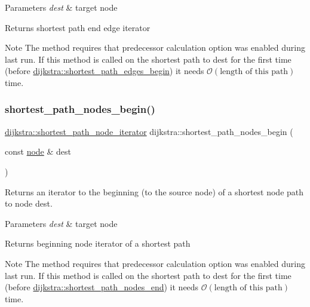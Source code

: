\begin{DoxyParams}{Parameters}
{\em dest} & target node\\
\hline
\end{DoxyParams}
\begin{DoxyReturn}{Returns}
shortest path end edge iterator
\end{DoxyReturn}
\begin{DoxyNote}{Note}
The method requires that predecessor calculation option was enabled during last run. If this method is called on the shortest path to {\ttfamily dest} for the first time (before \mbox{\hyperlink{classdijkstra_ad7ef6f747b68f8951322b265844dbb8a}{dijkstra\+::shortest\+\_\+path\+\_\+edges\+\_\+begin}}) it needs $\mathcal{O}(\mbox{length of this path})$ time. 
\end{DoxyNote}
\mbox{\label{classdijkstra_ae30c66319d925387ed858aab9ce419ae}} 
\subsubsection{\texorpdfstring{shortest\+\_\+path\+\_\+nodes\+\_\+begin()}{shortest\_path\_nodes\_begin()}}
{\footnotesize\ttfamily \mbox{\hyperlink{classdijkstra_a5062e9a8339848666efcf2143c4c1881}{dijkstra\+::shortest\+\_\+path\+\_\+node\+\_\+iterator}} dijkstra\+::shortest\+\_\+path\+\_\+nodes\+\_\+begin (\begin{DoxyParamCaption}\item[{const \mbox{\hyperlink{classnode}{node}} \&}]{dest }\end{DoxyParamCaption})}



Returns an iterator to the beginning (to the source node) of a shortest node path to node {\ttfamily dest}. 


\begin{DoxyParams}{Parameters}
{\em dest} & target node\\
\hline
\end{DoxyParams}
\begin{DoxyReturn}{Returns}
beginning node iterator of a shortest path
\end{DoxyReturn}
\begin{DoxyNote}{Note}
The method requires that predecessor calculation option was enabled during last run. If this method is called on the shortest path to {\ttfamily dest} for the first time (before \mbox{\hyperlink{classdijkstra_ae9846beeabd53a8cf0c0c1af328235b2}{dijkstra\+::shortest\+\_\+path\+\_\+nodes\+\_\+end}}) it needs $\mathcal{O}(\mbox{length of this path})$ time. 
\end{DoxyNote}
\mbox{\label{classdijkstra_ae9846beeabd53a8cf0c0c1af328235b2}} 
